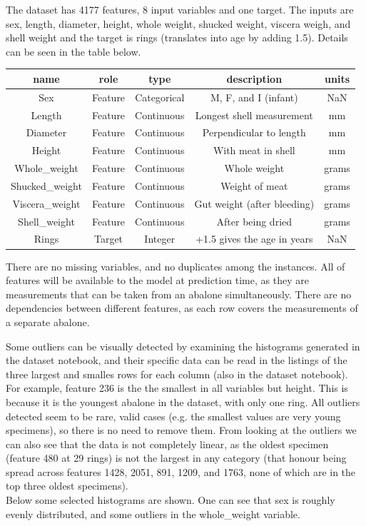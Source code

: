 \documentclass[a4paper, 12pt]{article}
\begin{document}
The dataset has 4177 features, 8 input variables and one target. The inputs are sex, length, diameter, height, whole weight, shucked weight, viscera weigh, and shell weight and the target is rings (translates into age by adding 1.5).
Details can be seen in the table below.\vspace{0.5cm}\\
\begin{tabular}{ |c|c|c|c|c|} 
\hline
          name  &   role &        type  & description                & units   \\
\hline
          Sex & Feature &  Categorical & M, F, and I (infant)       & NaN         \\
\hline 
        Length & Feature &  Continuous  & Longest shell measurement  & mm         \\  
\hline
      Diameter & Feature &  Continuous  & Perpendicular to length    & mm           \\
\hline      
  Height & Feature &  Continuous        & With meat in shell         & mm      \\ 
\hline  
Whole\_weight& Feature &  Continuous   & Whole weight               & grams   \\   
\hline
Shucked\_weight& Feature &  Continuous  & Weight of meat             & grams    \\   
\hline
Viscera\_weight& Feature &  Continuous  & Gut weight (after bleeding)& grams    \\   
\hline  
Shell\_weight& Feature &  Continuous    & After being dried          & grams   \\   
\hline         
Rings & Target  &  Integer              & +1.5 gives the age in years& NaN           \\
\hline   

\end{tabular}

There are no missing variables, and no duplicates among the instances. All of features will be available to the model at prediction time, as they are measurements that can be taken from an abalone simultaneously.
There are no dependencies between different features, as each row covers the measurements of a separate abalone.

Some outliers can be visually detected by examining the histograms generated in the dataset notebook, and their specific data can be read in the listings of the three largest and smalles rows for each column (also in the dataset notebook). 
For example, feature 236 is the the smallest in all variables but height. This is because it is the youngest abalone in the dataset, with only one ring.
All outliers detected seem to be rare, valid cases (e.g. the smallest values are very young specimens), so there is no need to remove them.
From looking at the outliers we can also see that the data is not completely linear, as the oldest specimen (feature 480 at 29 rings) is not the largest in any category (that honour being spread across features 1428, 2051, 891, 1209, and 1763, none of which are in the top three oldest specimens).\\
Below some selected histograms are shown. One can see that sex is roughly evenly distributed, and some outliers in the whole\_weight variable.
\end{document}
